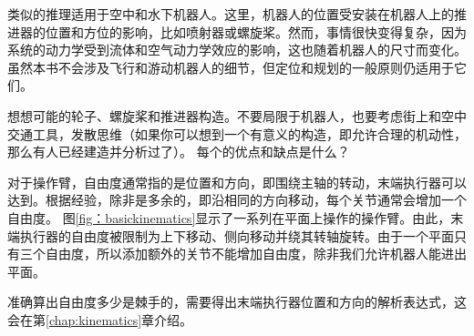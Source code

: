 类似的推理适用于空中和水下机器人。这里，机器人的位置受安装在机器人上的推进器的位置和方位的影响，比如喷射器或螺旋桨。然而，事情很快变得复杂，因为系统的动力学受到流体和空气动力学效应的影响，这也随着机器人的尺寸而变化。虽然本书不会涉及飞行和游动机器人的细节，但定位和规划的一般原则仍适用于它们。

\begin{framed}
想想可能的轮子、螺旋桨和推进器构造。不要局限于机器人，也要考虑街上和空中交通工具，发散思维（如果你可以想到一个有意义的构造，即允许合理的机动性，那么有人已经建造并分析过了）。 每个的优点和缺点是什么？
\end{framed}



对于操作臂，自由度通常指的是位置和方向，即围绕主轴的转动，末端执行器可以达到。根据经验，除非是多余的，即沿相同的方向移动，每个关节通常会增加一个自由度。 图\ref{fig：basickinematics}显示了一系列在平面上操作的操作臂。由此，末端执行器的自由度被限制为上下移动、侧向移动并绕其转轴旋转。由于一个平面只有三个自由度，所以添加额外的关节不能增加自由度，除非我们允许机器人能进出平面。

准确算出自由度多少是棘手的，需要得出末端执行器位置和方向的解析表达式，这会在第\ref{chap:kinematics}章介绍。

